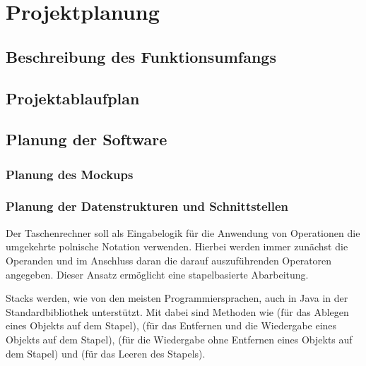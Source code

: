 \section{Projektplanung}

\subsection{Beschreibung des Funktionsumfangs}

\subsection{Projektablaufplan}

\subsection{Planung der Software}

\subsubsection{Planung des Mockups}

\subsubsection{Planung der Datenstrukturen und Schnittstellen}


Der Taschenrechner soll als Eingabelogik für die Anwendung von Operationen die umgekehrte polnische Notation verwenden. Hierbei werden immer zunächst die Operanden und im Anschluss daran die darauf auszuführenden Operatoren angegeben. Dieser Ansatz ermöglicht eine stapelbasierte Abarbeitung. 

Stacks werden, wie von den meisten Programmiersprachen, auch in Java in der Standardbibliothek unterstützt. Mit dabei sind Methoden wie  (für das Ablegen eines Objekts auf dem Stapel),  (für das Entfernen und die Wiedergabe eines Objekts auf dem Stapel),  (für die Wiedergabe ohne Entfernen eines Objekts auf dem Stapel) und  (für das Leeren des Stapels). 

